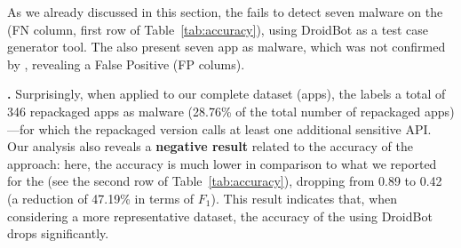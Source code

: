 
As we already discussed in this section, the \mas fails
to detect seven malware on the \sds (FN column, first row of Table~\ref{tab:accuracy}),
using DroidBot as a test case generator tool. The \mas also present seven app as malware, which was not confirmed by \vt, revealing a False Positive (FP colums).






{\bf \cds.} Surprisingly, when applied to our complete dataset (\apps apps), the \mas
labels a total of 346 repackaged apps as malware (28.76\% of the total number of repackaged
apps)---for which the repackaged version calls at least one additional sensitive API.
Our analysis also reveals a {\bf negative result} related to the accuracy of the approach: here,
the accuracy is much lower in comparison to what we reported for the
\sds (see the second row of Table~\ref{tab:accuracy}), dropping from 0.89 to 0.42 (a reduction of 47.19\% in terms of $F_1$).
This result indicates that, when considering a more representative dataset, the accuracy of the \mas using
DroidBot drops significantly. 





